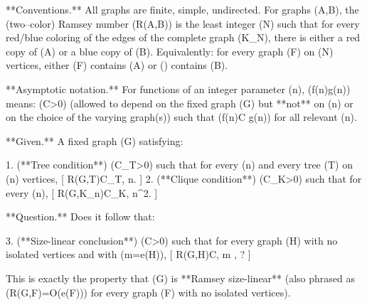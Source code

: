 **Conventions.** All graphs are finite, simple, undirected.
For graphs (A,B), the (two–color) Ramsey number (R(A,B)) is the least integer (N) such that for every red/blue coloring of the edges of the complete graph (K_N), there is either a red copy of (A) or a blue copy of (B). Equivalently: for every graph (F) on (N) vertices, either (F) contains (A) or () contains (B).

**Asymptotic notation.** For functions of an integer parameter (n), (f(n)\ll g(n)) means: (\exists C>0) (allowed to depend on the fixed graph (G) but **not** on (n) or on the choice of the varying graph(s)) such that (f(n)\le C g(n)) for all relevant (n).

**Given.** A fixed graph (G) satisfying:

1. (**Tree condition**) (\exists C_T>0) such that for every (n) and every tree (T) on (n) vertices,
   [
   R(G,T)\le C_T, n.
   ]
2. (**Clique condition**) (\exists C_K>0) such that for every (n),
   [
   R(G,K_n)\le C_K, n^2.
   ]

**Question.** Does it follow that:

3. (**Size-linear conclusion**) (\exists C>0) such that for every graph (H) with no isolated vertices and with (m=e(H)),
   [
   R(G,H)\le C, m , ?
   ]

This is exactly the property that (G) is **Ramsey size-linear** (also phrased as (R(G,F)=O(e(F))) for every graph (F) with no isolated vertices).
